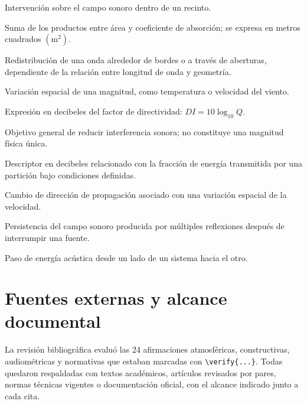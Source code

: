\begin{description}[style=nextline]
    \item[Acondicionamiento acústico.]
    Intervención sobre el campo sonoro dentro de un recinto.

    \item[Área equivalente de absorción (\(A\)).]
    Suma de los productos entre área y coeficiente de absorción; se expresa en
    metros cuadrados \((\text{m}^2)\).

    \item[Difracción.]
    Redistribución de una onda alrededor de bordes o a través de aberturas,
    dependiente de la relación entre longitud de onda y geometría.

    \item[Gradiente.]
    Variación espacial de una magnitud, como temperatura o velocidad del
    viento.

    \item[Índice de directividad (\(DI\)).]
    Expresión en decibeles del factor de directividad:
    \(DI=10\log_{10}Q\).

    \item[Insonorización.]
    Objetivo general de reducir interferencia sonora; no constituye una
    magnitud física única.

    \item[Pérdida por transmisión.]
    Descriptor en decibeles relacionado con la fracción de energía transmitida
    por una partición bajo condiciones definidas.

    \item[Refracción.]
    Cambio de dirección de propagación asociado con una variación espacial de
    la velocidad.

    \item[Reverberación.]
    Persistencia del campo sonoro producida por múltiples reflexiones después
    de interrumpir una fuente.

    \item[Transmisión.]
    Paso de energía acústica desde un lado de un sistema hacia el otro.
\end{description}

\section{Fuentes externas y alcance documental}
\label{sec:u9-fuentes}

La revisión bibliográfica evaluó las 24 afirmaciones atmosféricas,
constructivas, audiométricas y normativas que estaban marcadas con
\verb|\verify{...}|. Todas quedaron respaldadas con textos académicos,
artículos revisados por pares, normas técnicas vigentes o documentación
oficial, con el alcance indicado junto a cada cita.

